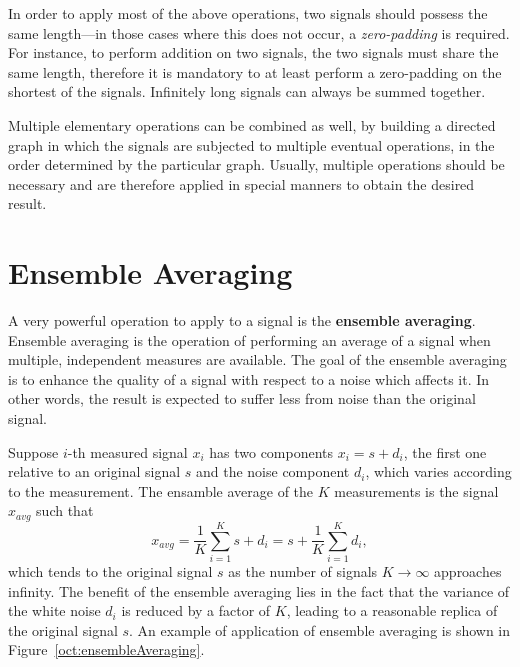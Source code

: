 \documentclass[\documentfontsize, twocolumn]{\classname}
\begin{document}
In order to apply most of the above operations, two signals should possess the same length---in those cases where this does not occur, a \emph{zero-padding} is required. For instance, to perform addition on two signals, the two signals must share the same length, therefore it is mandatory to at least perform a zero-padding on the shortest of the signals. Infinitely long signals can always be summed together.

Multiple elementary operations can be combined as well, by building a directed graph in which the signals are subjected to multiple eventual operations, in the order determined by the particular graph. Usually, multiple operations should be necessary and are therefore applied in special manners to obtain the desired result.

\section{Ensemble Averaging}

A very powerful operation to apply to a signal is the \textbf{ensemble averaging}. Ensemble averaging is the operation of performing an average of a signal when multiple, independent measures are available. The goal of the ensemble averaging is to enhance the quality of a signal with respect to a noise which affects it. In other words, the result is expected to suffer less from noise than the original signal.

Suppose $i$-th measured signal $x_i$ has two components $x_i = s + d_i$, the
first one relative to an original signal $s$ and the noise component $d_i$, which
varies according to the measurement. The ensamble average of the $K$ measurements is the signal $x_{avg}$ such that
\begin{equation}\label{eqn:EnsambleAveraging}
	x_{avg} = \frac{1}{K}\sum_{i=1}^{K} s + d_i = s + \frac{1}{K}\sum_{i=1}^{K}d_i,
\end{equation}
which tends to the original signal $s$ as the number of signals $K \rightarrow \infty$ approaches infinity. The benefit of the ensemble averaging lies in the fact that the variance of the white noise $d_i$ is reduced by a factor of $K$, leading to a reasonable replica of the original signal $s$. An example of application of ensemble averaging is shown in Figure~\ref{oct:ensembleAveraging}.

\begin{figure*}[ht]
\begin{center}
\scalebox{0.32}{


}\caption{The ensemble averaging. On the left, the original uncorrupted sequence $s[n]$, the noise $d[n]$ and the corrupted sequence $x[n]$. On the right, the dashed line represents the sequence $y[n]$, a ``recovered'' version of the original sequence $s[n]$. Recovering has been performed by means of the ensemble averaging process.}\label{oct:ensembleAveraging}
\end{center}
\end{figure*}
\end{document}
